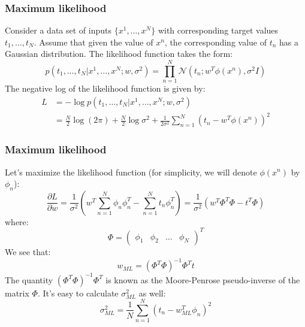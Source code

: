 \documentclass{beamer}
\begin{document}
\begin{frame}
    \frametitle{Maximum likelihood}
    Consider a data set of inputs $\{x^{1},\hdots,x^{N}\}$ with corresponding target values $t_{1},\hdots,t_{N}$. Assume that given the value of $x^{n}$, the corresponding value of $t_{n}$ has a Gaussian distribution. The likelihood function takes the form:
    \begin{equation*}
        p(t_{1},\hdots,t_{N}|x^{1},\hdots,x^{N};w,\sigma^{2})=\prod_{n=1}^{N}\mathcal{N}(t_{n};w^{T}\phi(x^{n}),\sigma^{2}I)
    \end{equation*}
    The negative log of the likelihood function is given by:
    \begin{align*}
        L&=-\log{}p(t_{1},\hdots,t_{N}|x^{1},\hdots,x^{N};w,\sigma^{2}) \\
        &=\frac{N}{2}\log(2\pi)+\frac{N}{2}\log\sigma^{2}+\frac{1}{2\sigma^{2}}\sum_{n=1}^{N}(t_{n}-w^{T}\phi(x^{n}))^{2}
    \end{align*}
\end{frame}

\begin{frame}
    \frametitle{Maximum likelihood}
    Let's maximize the likelihood function (for simplicity, we will denote $\phi(x^{n})$ by $\phi_{n}$):
    \begin{equation*}
        \frac{\partial{}L}{\partial{}w}=\frac{1}{\sigma^{2}}(w^{T}\sum_{n=1}^{N}\phi_{n}\phi_{n}^{T}-\sum_{n=1}^{N}t_{n}\phi_{n}^{T})=\frac{1}{\sigma^{2}}(w^{T}\Phi^{T}\Phi-t^{T}\Phi)
    \end{equation*}
    where:
    \begin{equation*}
        \Phi=\begin{pmatrix}
            \phi_{1}&\phi_{2}&\hdots&\phi_{N}
        \end{pmatrix}^{T}
    \end{equation*}
    We see that:
    \begin{equation*}
        w_{ML}=(\Phi^{T}\Phi)^{-1}\Phi^{T}t
    \end{equation*}
    The quantity $(\Phi^{T}\Phi)^{-1}\Phi^{T}$ is known as the Moore-Penrose pseudo-inverse of the matrix $\Phi$. It's easy to calculate $\sigma^{2}_{ML}$ as well:
    \begin{equation*}
        \sigma^{2}_{ML}=\frac{1}{N}\sum_{n=1}^{N}(t_{n}-w_{ML}^{T}\phi_{n})^{2}
    \end{equation*}
\end{frame}
\end{document}
